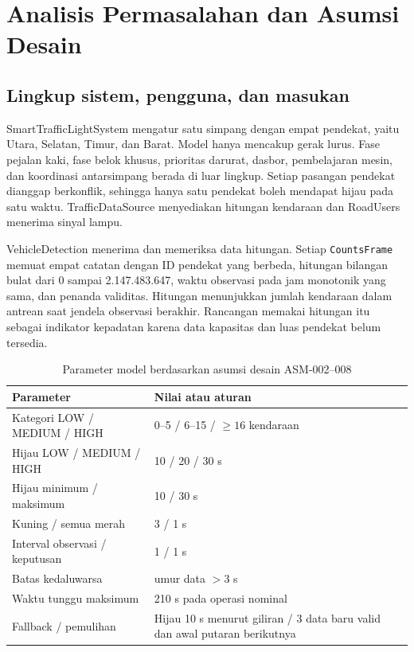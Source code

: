 \section{Analisis Permasalahan dan Asumsi Desain}
\subsection{Lingkup sistem, pengguna, dan masukan}
SmartTrafficLightSystem mengatur satu simpang dengan empat pendekat, yaitu Utara, Selatan, Timur, dan Barat. Model hanya mencakup gerak lurus. Fase pejalan kaki, fase belok khusus, prioritas darurat, dasbor, pembelajaran mesin, dan koordinasi antarsimpang berada di luar lingkup. Setiap pasangan pendekat dianggap berkonflik, sehingga hanya satu pendekat boleh mendapat hijau pada satu waktu. TrafficDataSource menyediakan hitungan kendaraan dan RoadUsers menerima sinyal lampu.

VehicleDetection menerima dan memeriksa data hitungan. Setiap \texttt{CountsFrame} memuat empat catatan dengan ID pendekat yang berbeda, hitungan bilangan bulat dari 0 sampai 2.147.483.647, waktu observasi pada jam monotonik yang sama, dan penanda validitas. Hitungan menunjukkan jumlah kendaraan dalam antrean saat jendela observasi berakhir. Rancangan memakai hitungan itu sebagai indikator kepadatan karena data kapasitas dan luas pendekat belum tersedia.

\begin{table}[htbp]\centering
\caption{Parameter model berdasarkan asumsi desain ASM-002--008}
\begin{tabular}{|p{.43\linewidth}|p{.44\linewidth}|}
\hline
\textbf{Parameter} & \textbf{Nilai atau aturan} \\ \hline
Kategori LOW / MEDIUM / HIGH & 0--5 / 6--15 / $\geq 16$ kendaraan \\ \hline
Hijau LOW / MEDIUM / HIGH & 10 / 20 / 30 s \\ \hline
Hijau minimum / maksimum & 10 / 30 s \\ \hline
Kuning / semua merah & 3 / 1 s \\ \hline
Interval observasi / keputusan & 1 / 1 s \\ \hline
Batas kedaluwarsa & umur data $>3$ s \\ \hline
Waktu tunggu maksimum & 210 s pada operasi nominal \\ \hline
Fallback / pemulihan & Hijau 10 s menurut giliran / 3 data baru valid dan awal putaran berikutnya \\ \hline
\end{tabular}
\end{table}

